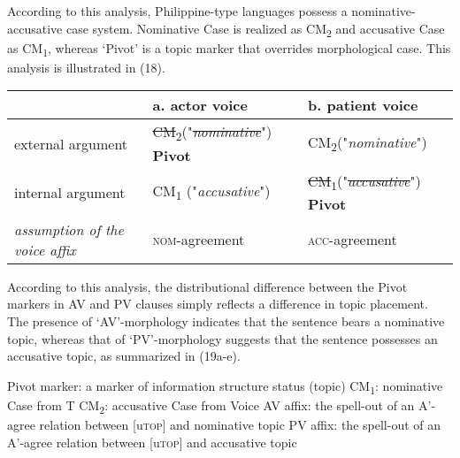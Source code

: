 \documentclass[10pt]{article}
\begin{document}
According to this analysis, Philippine-type languages possess a nominative-accusative case system. Nominative Case is realized as CM\textsubscript{2} and accusative Case as CM\textsubscript{1}, whereas `Pivot' is a topic marker that overrides morphological case. This analysis is illustrated in (18). 




\begin{exe}
\vspace{-1mm}
\begin{table}[h]
\hspace{+1.2cm}\begin{tabular}{lll}
     & a. actor voice       & b. patient voice      \\\midrule
    external argument   & \st{CM}\textsubscript{2}("\emph{\st{nominative}}")  {\bf Pivot}  & CM\textsubscript{2}("\emph{nominative}")  \\
    internal argument   & CM\textsubscript{1} ("\emph{accusative}")      & \st{CM}\textsubscript{1}("\emph{\st{accusative}}") {\bf Pivot}  \\\midrule
      \textit{assumption of the voice affix}           & \textsc{nom}-agreement          & \textsc{acc}-agreement     \\ 
\end{tabular}
\end{table}
\end{exe}
\vspace{-5mm}

According to this analysis, the distributional difference between the Pivot markers in AV and PV clauses simply reflects a difference in topic placement. The presence of `AV'-morphology indicates that the sentence bears a nominative topic, whereas that of `PV'-morphology suggests that the sentence possesses an accusative topic, as summarized in (19a-e).


\begin{exe}
\ex 
    \begin{xlist}
\ex Pivot marker: a marker of information structure status (topic)
\ex CM\textsubscript{1}: nominative Case from T
\ex CM\textsubscript{2}: accusative Case from Voice
\ex AV affix: the spell-out of an A'-agree relation between [u\textsc{top]} and nominative topic
\ex PV affix: the spell-out of an A'-agree relation between [u\textsc{top]} and accusative topic

\end{xlist}
\end{exe}
 
\end{document}
